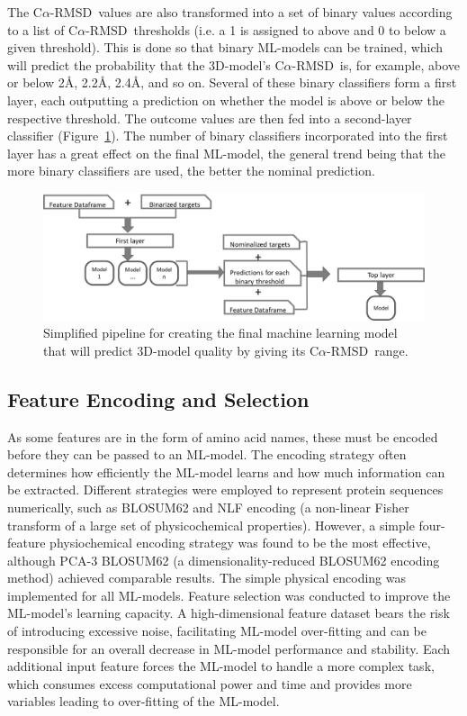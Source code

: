 \documentclass[12pt]{article}
\newcommand{\carmsd}{\mbox{C$\alpha$-RMSD}}
\begin{document}
The \carmsd\ values are also transformed into a set of binary values according to a
list of \carmsd\ thresholds (i.e. a 1 is assigned to above and 0 to below a given threshold). This is done so that binary ML-models can be
trained, which will predict the probability that the 3D-model's \carmsd\
is, for example, above or below 2\AA, 2.2\AA, 2.4\AA, and so on. Several of these binary classifiers form a first layer, each outputting a prediction on whether the model is above or below the respective threshold. The outcome values are then fed into a second-layer classifier (Figure~\ref{fig:flow}). The number of binary
classifiers incorporated into the first layer has a great effect on
the final ML-model, the general trend being that the more binary
classifiers are used, the better the nominal prediction. 


\begin{figure}
  \centering
  \includegraphics[width=\textwidth]{simple_flow.eps}
  \caption {Simplified pipeline for creating the final machine learning model that will predict 3D-model quality by giving its \carmsd\ range.}
  \label{fig:flow}
\end{figure}

\subsection{Feature Encoding and Selection}

As some features are in the form of amino acid names, these must be
encoded before they can be passed to an ML-model. The
encoding strategy often determines how efficiently the ML-model learns
and how much information can be extracted. Different strategies were
employed to represent protein sequences numerically, such as
BLOSUM62\cite{Henikoff1992} and NLF\cite{Nanni2011} encoding (a
non-linear Fisher transform of a large set of physicochemical
properties). However, a simple four-feature physiochemical encoding
strategy\cite{Abhinandan2010} was found to be the most effective,
although PCA-3 BLOSUM62 (a dimensionality-reduced BLOSUM62 encoding
method) achieved comparable results. The simple physical encoding was
implemented for all ML-models.
Feature selection was conducted to improve the ML-model's learning
capacity. A high-dimensional feature dataset bears the risk of
introducing excessive noise, facilitating ML-model over-fitting and can be
responsible for an overall decrease in ML-model performance and
stability. Each additional input feature forces the ML-model to
handle a more complex task, which consumes excess computational power
and time and provides more variables leading to over-fitting of the ML-model.
\end{document}
